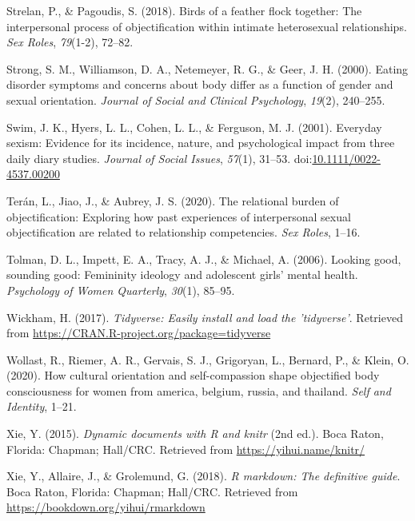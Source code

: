 \documentclass[man]{apa6}
\begin{document}
\hypertarget{ref-strelan2018birds}{}
Strelan, P., \& Pagoudis, S. (2018). Birds of a feather flock together:
The interpersonal process of objectification within intimate
heterosexual relationships. \emph{Sex Roles}, \emph{79}(1-2), 72--82.

\hypertarget{ref-strong2000eating}{}
Strong, S. M., Williamson, D. A., Netemeyer, R. G., \& Geer, J. H.
(2000). Eating disorder symptoms and concerns about body differ as a
function of gender and sexual orientation. \emph{Journal of Social and
Clinical Psychology}, \emph{19}(2), 240--255.

\hypertarget{ref-swimetal}{}
Swim, J. K., Hyers, L. L., Cohen, L. L., \& Ferguson, M. J. (2001).
Everyday sexism: Evidence for its incidence, nature, and psychological
impact from three daily diary studies. \emph{Journal of Social Issues},
\emph{57}(1), 31--53.
doi:\href{https://doi.org/10.1111/0022-4537.00200}{10.1111/0022-4537.00200}

\hypertarget{ref-teran2020relational}{}
Terán, L., Jiao, J., \& Aubrey, J. S. (2020). The relational burden of
objectification: Exploring how past experiences of interpersonal sexual
objectification are related to relationship competencies. \emph{Sex
Roles}, 1--16.

\hypertarget{ref-tolman2006looking}{}
Tolman, D. L., Impett, E. A., Tracy, A. J., \& Michael, A. (2006).
Looking good, sounding good: Femininity ideology and adolescent girls'
mental health. \emph{Psychology of Women Quarterly}, \emph{30}(1),
85--95.

\hypertarget{ref-R-tidyverse}{}
Wickham, H. (2017). \emph{Tidyverse: Easily install and load the
'tidyverse'}. Retrieved from
\url{https://CRAN.R-project.org/package=tidyverse}

\hypertarget{ref-wollast2020cultural}{}
Wollast, R., Riemer, A. R., Gervais, S. J., Grigoryan, L., Bernard, P.,
\& Klein, O. (2020). How cultural orientation and self-compassion shape
objectified body consciousness for women from america, belgium, russia,
and thailand. \emph{Self and Identity}, 1--21.

\hypertarget{ref-R-knitr}{}
Xie, Y. (2015). \emph{Dynamic documents with R and knitr} (2nd ed.).
Boca Raton, Florida: Chapman; Hall/CRC. Retrieved from
\url{https://yihui.name/knitr/}

\hypertarget{ref-R-rmarkdown}{}
Xie, Y., Allaire, J., \& Grolemund, G. (2018). \emph{R markdown: The
definitive guide}. Boca Raton, Florida: Chapman; Hall/CRC. Retrieved
from \url{https://bookdown.org/yihui/rmarkdown}
\end{document}
